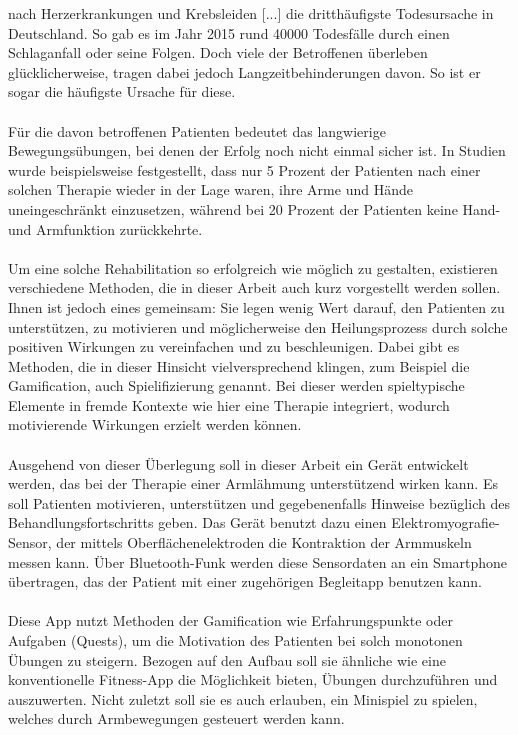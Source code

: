  nach Herzerkrankungen und Krebsleiden [...] die dritthäufigste Todesursache in Deutschland.\grqq\cite{Src:ApoFlex} So gab es im Jahr 2015 rund 40000 Todesfälle durch einen Schlaganfall oder seine Folgen.\cite{Src:Destatis} Doch viele der Betroffenen überleben glücklicherweise, tragen dabei jedoch Langzeitbehinderungen davon. So ist er sogar die häufigste Ursache für diese. \\ \\
Für die davon betroffenen Patienten bedeutet das langwierige Bewegungsübungen, bei denen der Erfolg noch nicht einmal sicher ist. In Studien wurde beispielsweise festgestellt, dass nur 5 Prozent der Patienten nach einer solchen Therapie wieder in der Lage waren, ihre Arme und Hände uneingeschränkt einzusetzen, während bei 20 Prozent der Patienten keine Hand- und Armfunktion zurückkehrte.\cite{Src:RehabNelles} \\ \\
Um eine solche Rehabilitation so erfolgreich wie möglich zu gestalten, existieren verschiedene Methoden, die in dieser Arbeit auch kurz vorgestellt werden sollen. Ihnen ist jedoch eines gemeinsam: Sie legen wenig Wert darauf, den Patienten zu unterstützen, zu motivieren und möglicherweise den Heilungsprozess durch solche positiven Wirkungen zu vereinfachen und zu beschleunigen. Dabei gibt es Methoden, die in dieser Hinsicht vielversprechend klingen, zum Beispiel die Gamification, auch Spielifizierung genannt. Bei dieser werden spieltypische Elemente in fremde Kontexte wie hier eine Therapie integriert, wodurch motivierende Wirkungen erzielt werden können. \\ \\
Ausgehend von dieser Überlegung soll in dieser Arbeit ein Gerät entwickelt werden, das bei der Therapie einer Armlähmung unterstützend wirken kann. Es soll Patienten motivieren, unterstützen und gegebenenfalls Hinweise bezüglich des Behandlungsfortschritts geben. Das Gerät benutzt dazu einen Elektromyografie-Sensor, der mittels Oberflächenelektroden die Kontraktion der Armmuskeln messen kann. Über Bluetooth-Funk werden diese Sensordaten an ein Smartphone übertragen, das der Patient mit einer zugehörigen Begleitapp benutzen kann. \\ \\
Diese App nutzt Methoden der Gamification wie Erfahrungspunkte oder Aufgaben (\glqq Quests\grqq), um die Motivation des Patienten bei solch monotonen Übungen zu steigern. Bezogen auf den Aufbau soll sie ähnliche wie eine konventionelle Fitness-App die Möglichkeit bieten, Übungen durchzuführen und auszuwerten. Nicht zuletzt soll sie es auch erlauben, ein Minispiel zu spielen, welches durch Armbewegungen gesteuert werden kann. \\ \\
